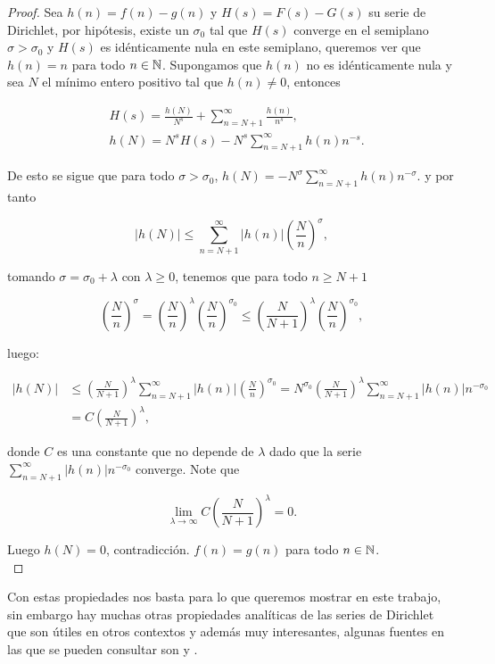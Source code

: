 \begin{proof}
Sea $h(n)=f(n)-g(n)$ y $H(s)=F(s)-G(s)$ su serie de Dirichlet, por hipótesis, existe un $\sigma_0$ tal que $H(s)$ converge en el semiplano $\sigma>\sigma_0$ y $H(s)$ es idénticamente nula en este semiplano, queremos ver que $h(n)=n$ para todo $n\in \mathbb{N}$. Supongamos que $h(n)$ no es idénticamente nula y sea $N$ el mínimo entero positivo tal que $h(n)\neq 0$, entonces

\begin{align*}
    &H(s)=\frac{h(N)}{N^s}+\sum_{n=N+1}^{\infty} \frac{h(n)}{n^s},\\
    &h(N)=N^s H(s)-N^s \sum_{n=N+1}^{\infty} h(n) n^{-s}
.\end{align*}

De esto se sigue que para todo $\sigma>\sigma_0$, $h(N)=-N^{\sigma}\displaystyle \sum_{n=N+1}^{\infty} h(n) n^{-\sigma}.$ y por tanto

$$\left|h(N)\right|\leq\sum_{n=N+1}^{\infty} |h(n)|\left(\frac{N}{n}\right)^{\sigma},
    $$

tomando $\sigma=\sigma_0+\lambda$ con $\lambda\geq 0$, tenemos que para todo $n\geq N+1$

$$\left(\frac{N}{n}\right)^{\sigma}=\left(\frac{N}{n}\right)^{\lambda}\left(\frac{N}{n}\right)^{\sigma_0}\leq \left(\frac{N}{N+1}\right)^{\lambda}\left(\frac{N}{n}\right)^{\sigma_0},$$

luego:

$$\begin{aligned}
\left|h(N)\right|&\leq \left(\frac{N}{N+1}\right)^{\lambda}\sum_{n=N+1}^{\infty} |h(n)|\left(\frac{N}{n}\right)^{\sigma_0}=N^{\sigma_0}\left(\frac{N}{N+1}\right)^{\lambda}\sum_{n=N+1}^{\infty} |h(n)|n^{-\sigma_0}\\
&=C\left(\frac{N}{N+1}\right)^{\lambda},
\end{aligned}
    $$

donde $C$ es una constante que no depende de $\lambda$ dado que la serie $\displaystyle \sum_{n=N+1}^{\infty} |h(n)|n^{-\sigma_0}$ converge. Note que

$$\lim_{\lambda\to \infty} C\left(\frac{N}{N+1}\right)^{\lambda}=0.$$

Luego $h(N)=0$, contradicción. $f(n)=g(n)$ para todo $n\in \mathbb{N}$.\\
\end{proof}

Con estas propiedades nos basta para lo que queremos mostrar en este trabajo, sin embargo hay muchas otras propiedades analíticas de las series de Dirichlet que son útiles en otros contextos y además muy interesantes, algunas fuentes en las que se pueden consultar son \cite{apostol1998introduction} y \cite{montgomery2007multiplicative}.

